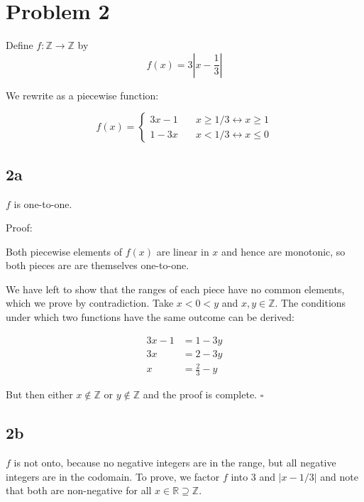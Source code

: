 \documentclass{article}
\begin{document}
\section*{Problem 2}

Define $f: \mathbb{Z} \rightarrow \mathbb{Z}$ by 
\begin{equation*}
  f(x) = 3 \left|x - \frac{1}{3}\right|
\end{equation*}

We rewrite as a piecewise function: 

\begin{equation*}
  f(x) = \left\{
    \begin{array}{ll}
      3x - 1 &\quad x \geq 1/3 \leftrightarrow x \geq 1 \\
      1 - 3x&\quad x < 1/3 \leftrightarrow x \leq 0
  \end{array}\right.
\end{equation*}
\subsection*{2a}

$f$ is one-to-one. 

Proof: 

Both piecewise elements of $f(x)$ are linear in $x$ and hence are monotonic, so both pieces are are themselves one-to-one. 

We have left to show that the ranges of each piece have no common elements, which we prove by contradiction. Take $x < 0 < y$ and $x, y \in \mathbb{Z}$. The conditions under which two functions have the same outcome can be derived:

\begin{align}
  3x - 1 &= 1 - 3y \\
  3x &= 2 - 3y \\
  x &= \frac{2}{3} - y
\end{align}

But then either $x \notin \mathbb{Z}$ or $y \notin \mathbb{Z}$ and the proof is complete. $\square$
\subsection*{2b}

$f$ is not onto, because no negative integers are in the range, but all negative integers are in the codomain. To prove, we factor $f$ into $3$ and $\left| x - 1/3 \right|$ and note that both are non-negative for all $x \in \mathbb{R} \supseteq \mathbb{Z}$. 
\end{document}
